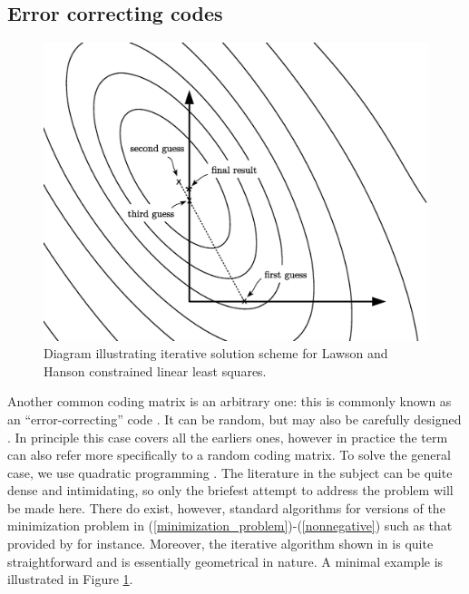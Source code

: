 \subsection{Error correcting codes}

\begin{figure}
  \includegraphics[width=1\textwidth]{Lawson_Hanson}
	\caption{Diagram illustrating iterative solution scheme for Lawson and Hanson constrained linear least squares.}\label{Lawson_Hanson_fig}
\end{figure}

Another common coding matrix is an arbitrary one: this is commonly
known as an ``error-correcting'' code \citep{Dietterich_Bakiri1995}.
It can be random, but may also be carefully designed 
\citep{Crammer_Singer2002,Zhou_etal2008,Zhong_Cheriet2013,Rocha_Goldenstein2014}.
In principle this case covers all the earliers ones, however in practice the
term can also refer more specifically to a random coding matrix.
To solve the general case, we use quadratic programming \citet{Boyd_Vandenberghe2004}.
The literature in the subject can be quite dense and intimidating, so
only the briefest attempt to address the problem will be made here. 
There do exist, however, standard algorithms
for versions of the minimization problem in 
(\ref{minimization_problem})-(\ref{nonnegative})
such as that provided by 
\citet{Lawson_Hanson1995} for instance. 
Moreover, the iterative algorithm shown in \citet{Lawson_Hanson1995}
is quite straightforward and is essentially geometrical in nature.
A minimal example is illustrated in Figure \ref{Lawson_Hanson_fig}.

